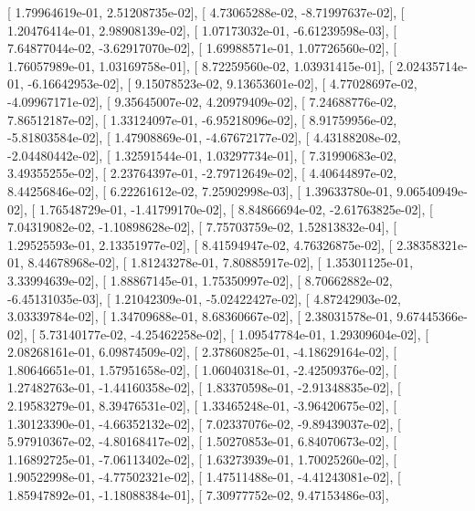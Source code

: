 \documentclass{article}
\begin{document}
       [  1.79964619e-01,   2.51208735e-02],
       [  4.73065288e-02,  -8.71997637e-02],
       [  1.20476414e-01,   2.98908139e-02],
       [  1.07173032e-01,  -6.61239598e-03],
       [  7.64877044e-02,  -3.62917070e-02],
       [  1.69988571e-01,   1.07726560e-02],
       [  1.76057989e-01,   1.03169758e-01],
       [  8.72259560e-02,   1.03931415e-01],
       [  2.02435714e-01,  -6.16642953e-02],
       [  9.15078523e-02,   9.13653601e-02],
       [  4.77028697e-02,  -4.09967171e-02],
       [  9.35645007e-02,   4.20979409e-02],
       [  7.24688776e-02,   7.86512187e-02],
       [  1.33124097e-01,  -6.95218096e-02],
       [  8.91759956e-02,  -5.81803584e-02],
       [  1.47908869e-01,  -4.67672177e-02],
       [  4.43188208e-02,  -2.04480442e-02],
       [  1.32591544e-01,   1.03297734e-01],
       [  7.31990683e-02,   3.49355255e-02],
       [  2.23764397e-01,  -2.79712649e-02],
       [  4.40644897e-02,   8.44256846e-02],
       [  6.22261612e-02,   7.25902998e-03],
       [  1.39633780e-01,   9.06540949e-02],
       [  1.76548729e-01,  -1.41799170e-02],
       [  8.84866694e-02,  -2.61763825e-02],
       [  7.04319082e-02,  -1.10898628e-02],
       [  7.75703759e-02,   1.52813832e-04],
       [  1.29525593e-01,   2.13351977e-02],
       [  8.41594947e-02,   4.76326875e-02],
       [  2.38358321e-01,   8.44678968e-02],
       [  1.81243278e-01,   7.80885917e-02],
       [  1.35301125e-01,   3.33994639e-02],
       [  1.88867145e-01,   1.75350997e-02],
       [  8.70662882e-02,  -6.45131035e-03],
       [  1.21042309e-01,  -5.02422427e-02],
       [  4.87242903e-02,   3.03339784e-02],
       [  1.34709688e-01,   8.68360667e-02],
       [  2.38031578e-01,   9.67445366e-02],
       [  5.73140177e-02,  -4.25462258e-02],
       [  1.09547784e-01,   1.29309604e-02],
       [  2.08268161e-01,   6.09874509e-02],
       [  2.37860825e-01,  -4.18629164e-02],
       [  1.80646651e-01,   1.57951658e-02],
       [  1.06040318e-01,  -2.42509376e-02],
       [  1.27482763e-01,  -1.44160358e-02],
       [  1.83370598e-01,  -2.91348835e-02],
       [  2.19583279e-01,   8.39476531e-02],
       [  1.33465248e-01,  -3.96420675e-02],
       [  1.30123390e-01,  -4.66352132e-02],
       [  7.02337076e-02,  -9.89439037e-02],
       [  5.97910367e-02,  -4.80168417e-02],
       [  1.50270853e-01,   6.84070673e-02],
       [  1.16892725e-01,  -7.06113402e-02],
       [  1.63273939e-01,   1.70025260e-02],
       [  1.90522998e-01,  -4.77502321e-02],
       [  1.47511488e-01,  -4.41243081e-02],
       [  1.85947892e-01,  -1.18088384e-01],
       [  7.30977752e-02,   9.47153486e-03],
\end{document}

